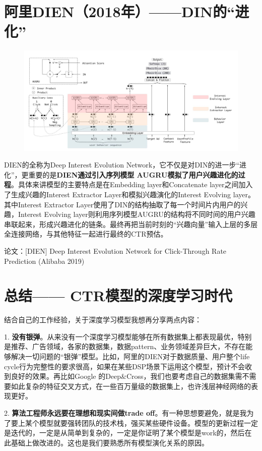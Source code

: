 \documentclass[12pt]{article}
\begin{document}
\section{阿里DIEN（2018年）——DIN的“进化”}
\begin{figure}[H]
    \centering
    \includegraphics[width=1\textwidth]{fig/Ali_DIEN_Structure.jpg}
\end{figure}

DIEN的全称为Deep Interest Evolution Network，它不仅是对DIN的进一步“进化”，更重要的是\textbf{DIEN通过引入序列模型 AUGRU模拟了用户兴趣进化的过程}。具体来讲模型的主要特点是在Embedding layer和Concatenate layer之间加入了生成兴趣的Interest Extractor Layer和模拟兴趣演化的Interest Evolving layer。其中Interest Extractor Layer使用了DIN的结构抽取了每一个时间片内用户的兴趣，Interest Evolving layer则利用序列模型AUGRU的结构将不同时间的用户兴趣串联起来，形成兴趣进化的链条。最终再把当前时刻的“兴趣向量”输入上层的多层全连接网络，与其他特征一起进行最终的CTR预估。

论文：[DIEN] Deep Interest Evolution Network for Click-Through Rate Prediction (Alibaba 2019)

\section{总结—— CTR模型的深度学习时代}
结合自己的工作经验，关于深度学习模型我想再分享两点内容：

1. \textbf{没有银弹}。从来没有一个深度学习模型能够在所有数据集上都表现最优，特别是推荐、广告领域，各家的数据集，数据pattern、业务领域差异巨大，不存在能够解决一切问题的“银弹”模型。比如，阿里的DIEN对于数据质量、用户整个life cycle行为完整性的要求很高，如果在某些DSP场景下运用这个模型，预计不会收到良好的效果。再比如Google 的Deep\&Cross，我们也要考虑自己的数据集需不需要如此复杂的特征交叉方式，在一些百万量级的数据集上，也许浅层神经网络的表现更好。

2. \textbf{算法工程师永远要在理想和现实间做trade off}。有一种思想要避免，就是我为了要上某个模型就要强转团队的技术栈，强买某些硬件设备。模型的更新过程一定是迭代的，一定是从简单到复杂的，一定是你证明了某个模型是work的，然后在此基础上做改进的。这也是我们要熟悉所有模型演化关系的原因。
\end{document}
